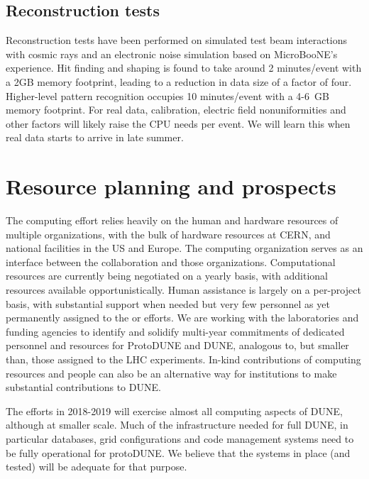 \subsection{Reconstruction tests}
Reconstruction tests have been performed on simulated test beam interactions with cosmic rays and an electronic noise simulation based on MicroBooNE's experience.  Hit finding and shaping is found to take around 2 minutes/event with a 2GB memory footprint, leading to a reduction in data size of a factor of four.  Higher-level pattern recognition occupies 10 minutes/event with a 4-6~GB memory footprint. For real data, calibration, electric field nonuniformities and other factors will likely raise the CPU needs per event. We will learn this when real data starts to arrive in late summer. 


\section{Resource planning and prospects}



The   computing effort  relies heavily on the human and hardware resources of  multiple organizations,  with the bulk of hardware resources at CERN, and national facilities in the US and Europe.  The    computing organization serves as an interface between the collaboration and those organizations.  Computational resources are currently being negotiated on a yearly basis, with additional resources available opportunistically. Human assistance is largely on a per-project  basis, with substantial support when needed but very few personnel as yet permanently assigned to the   or  efforts.  We are working with the laboratories and funding agencies to identify and solidify multi-year commitments of dedicated personnel and resources for ProtoDUNE and DUNE, analogous to, but smaller than, those assigned to the LHC experiments.   In-kind contributions of computing resources and people can also  be an alternative way for institutions to make substantial contributions to DUNE.

The  efforts in 2018-2019 will exercise almost all computing aspects of DUNE, although at smaller scale.  Much of the infrastructure needed for full DUNE, in particular  databases, grid configurations and code management systems need to be fully operational  for protoDUNE.   We believe that the systems in place (and tested) will be adequate for that purpose.

